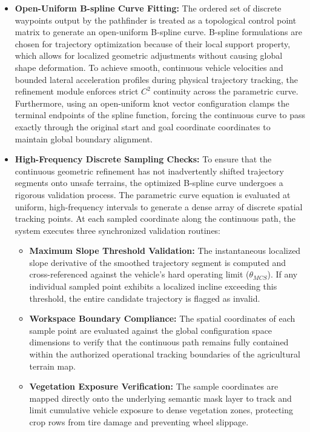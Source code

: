 \begin{itemize}
    \item \textbf{Open-Uniform B-spline Curve Fitting:} The ordered set of discrete waypoints output by the pathfinder is treated as a topological control point matrix to generate an open-uniform B-spline curve. B-spline formulations are chosen for trajectory optimization because of their local support property, which allows for localized geometric adjustments without causing global shape deformation. To achieve smooth, continuous vehicle velocities and bounded lateral acceleration profiles during physical trajectory tracking, the refinement module enforces strict $C^2$ continuity across the parametric curve. Furthermore, using an open-uniform knot vector configuration clamps the terminal endpoints of the spline function, forcing the continuous curve to pass exactly through the original start and goal coordinate coordinates to maintain global boundary alignment.

    \item \textbf{High-Frequency Discrete Sampling Checks:} To ensure that the continuous geometric refinement has not inadvertently shifted trajectory segments onto unsafe terrains, the optimized B-spline curve undergoes a rigorous validation process. The parametric curve equation is evaluated at uniform, high-frequency intervals to generate a dense array of discrete spatial tracking points. At each sampled coordinate along the continuous path, the system executes three synchronized validation routines:
    \begin{itemize}
        \item \textbf{Maximum Slope Threshold Validation:} The instantaneous localized slope derivative of the smoothed trajectory segment is computed and cross-referenced against the vehicle's hard operating limit ($\theta_{MCS}$). If any individual sampled point exhibits a localized incline exceeding this threshold, the entire candidate trajectory is flagged as invalid.
        \item \textbf{Workspace Boundary Compliance:} The spatial coordinates of each sample point are evaluated against the global configuration space dimensions to verify that the continuous path remains fully contained within the authorized operational tracking boundaries of the agricultural terrain map.
        \item \textbf{Vegetation Exposure Verification:} The sample coordinates are mapped directly onto the underlying semantic mask layer to track and limit cumulative vehicle exposure to dense vegetation zones, protecting crop rows from tire damage and preventing wheel slippage.
    \end{itemize}
\end{itemize}


